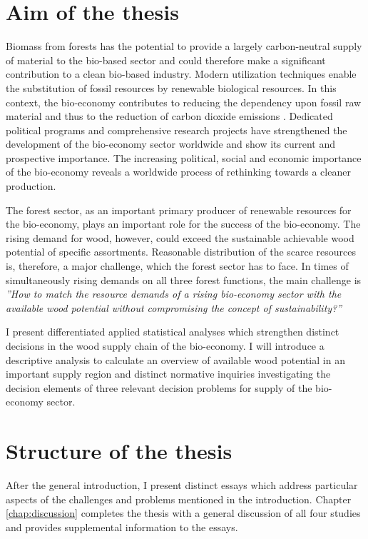 \section{Aim of the thesis}
\label{sec:intro:aim}
Biomass from forests has the potential to provide a largely carbon-neutral supply of material to the bio-based sector and could therefore make a significant contribution to a clean bio-based industry. Modern utilization techniques enable the substitution of fossil resources by renewable biological resources. In this context, the bio-economy contributes to reducing the dependency upon fossil raw material and thus to the reduction of carbon dioxide emissions \citep[p. 4]{ingrao_2016}. Dedicated political programs and comprehensive research projects have strengthened the development of the bio-economy sector worldwide and show its current and prospective importance. The increasing political, social and economic importance of the bio-economy \citep[e.g.][p. 15-16]{bmel_2014b} reveals a worldwide process of rethinking towards a cleaner production.

The forest sector, as an important primary producer of renewable resources for the bio-economy, plays an important role for the success of the bio-economy. The rising demand for wood, however, could exceed the sustainable achievable wood potential of specific assortments. Reasonable distribution of the scarce resources is, therefore, a major challenge, which the forest sector has to face. In times of simultaneously rising demands on all three forest functions, the main challenge is \textit{''How to match the resource demands of a rising bio-economy sector with the available wood potential without compromising the concept of sustainability?''}

I present differentiated applied statistical analyses which strengthen distinct decisions in the wood supply chain of the bio-economy. I will introduce a descriptive analysis to calculate an overview of available wood potential in an important supply region and distinct normative inquiries investigating the decision elements of three relevant decision problems for supply of the bio-economy sector.
	
\section{Structure of the thesis}
\label{sec:intro:struct}
After the general introduction, I present distinct essays which address particular aspects of the challenges and problems mentioned in the introduction. Chapter \ref{chap:discussion} completes the thesis with a general discussion of all four studies and provides supplemental information to the essays.

